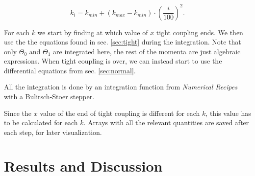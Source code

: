 \documentclass[a4paper,norsk, 10pt]{article}
\begin{document}
\begin{equation}
k_i = k_{min} + (k_{max}-k_{min})\cdot\left(\frac{i}{100}\right)^2.
\end{equation}

For each $k$ we start by finding at which value of $x$ tight coupling ends. We then use the the equations found in sec. \ref{sec:tight} during the integration. Note that only $\Theta_0$ and $\Theta_1$ are integrated here, the rest of the momenta are just algebraic expressions. When tight coupling is over, we can instead start to use the differential equations from sec. \ref{sec:normal}. 

All the integration is done by an integration function from \textit{Numerical Recipes} with a Bulirsch-Stoer stepper.

Since the $x$ value of the end of tight coupling is different for each $k$, this value has to be calculated for each $k$. Arrays with all the relevant quantities are saved after each step, for later visualization.


\section{Results and Discussion}
\end{document}

